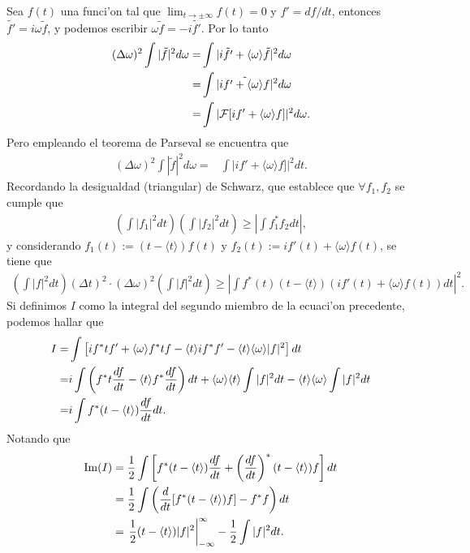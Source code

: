 Sea $f(t)$ una funci'on tal que $\lim_{t \rightarrow \pm \infty} f(t)=0$ y $f'=df/dt$, entonces $\tilde{f'}=i \omega \tilde{f}$, y podemos escribir $\omega \tilde{f}=-i \tilde{f'}$. Por lo tanto
\begin{align}
(\Delta \omega)^2 \int |\tilde{f}|^2 d\omega =&\int |i\tilde{f'}+\langle \omega \rangle \tilde{f}|^2 d \omega \notag \\
=&\int |\tilde{if'+\langle \omega \rangle f}|^2 d\omega \notag\\
=&\int |{\cal F}[if'+\langle \omega \rangle f]|^2 d\omega.
\end{align}
Pero empleando el teorema de Parseval se encuentra que
\begin{align}
(\Delta \omega)^2 \int |\tilde{f}|^2 d\omega =&\int |if'+\langle \omega \rangle f]|^2 dt.
\end{align}
Recordando la desigualdad (triangular) de Schwarz, que establece que $\forall f_{1},f_{2}$ se cumple que
\begin{align}
\left( \int |f_{1}|^2 dt \right)\left( \int |f_{2}|^2 dt\right) \geq \left|\int f_{1}^{*}f_{2}dt\right|,
\end{align}
y considerando $f_{1}(t):=(t-\langle t \rangle)f(t)$ y $f_{2}(t):=if'(t)+\langle \omega \rangle f(t)$, se tiene que
\begin{align}
\left(\int |f|^2 dt \right) (\Delta t)^2 \cdot (\Delta \omega)^2 \left(\int |f|^2 dt \right)\geq
\left|\int f^{*}(t)(t-\langle t \rangle)\left(if'(t)+ \langle\omega\rangle f(t)\right) dt\right|^2.
\end{align}
Si definimos $I$ como la integral del segundo miembro de la ecuaci'on precedente, podemos hallar que
\begin{align}
I=&\int \left[ i f^{*}t f'+\langle \omega \rangle f^{*} t f-\langle t \rangle i f^{*}f'-\langle t \rangle \langle \omega \rangle |f|^2\right]dt  \notag \\
=&i\int \left(f^{*} t \frac{df}{dt}-\langle t \rangle f^{*} \frac{df}{dt} \right) dt+\langle \omega \rangle \langle t \rangle \int |f|^2 dt-\langle t \rangle \langle \omega \rangle \int |f|^2 dt\notag \\
=&i \int f^{*}(t-\langle t\rangle)\frac{df}{dt} dt.
\end{align}
Notando que
\begin{align}
{\rm Im}(I) &= \frac{1}{2}\int \left[ f^{*}(t-\langle t \rangle)\frac{df}{dt}+\left(\frac{df}{dt}\right)^{*}(t-\langle t \rangle)f\right]dt\notag \\
&= \frac{1}{2}\int \left( \frac{d}{dt}[f^{*}(t-\langle t \rangle)f]-f^{*}f\right)dt\notag \\
&= \left. \frac{1}{2} (t-\langle t \rangle)|f|^2 \right|_{-\infty}^{\infty}-\frac{1}{2}\int |f|^2 dt.
\end{align}
